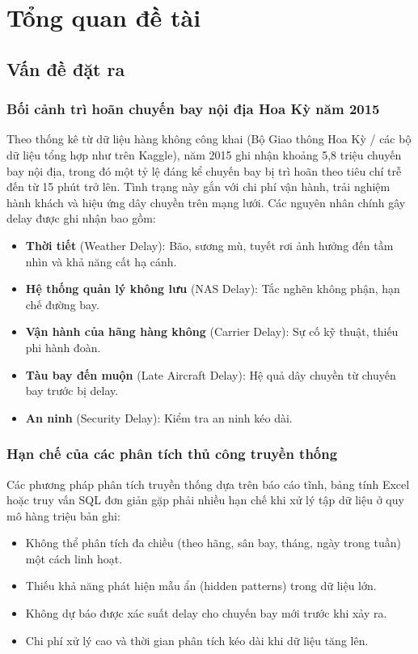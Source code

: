 \section{Tổng quan đề tài}

\subsection{Vấn đề đặt ra}

\subsubsection{Bối cảnh trì hoãn chuyến bay nội địa Hoa Kỳ năm 2015}

\indent Theo thống kê từ dữ liệu hàng không công khai (Bộ Giao thông Hoa Kỳ / các bộ dữ liệu tổng hợp như trên Kaggle),
năm 2015 ghi nhận khoảng 5{,}8 triệu chuyến bay nội địa, trong đó một tỷ lệ đáng kể chuyến bay bị trì hoãn
theo tiêu chí trễ đến từ 15 phút trở lên. Tình trạng này gắn với chi phí vận hành, trải nghiệm hành khách
và hiệu ứng dây chuyền trên mạng lưới.
Các nguyên nhân chính gây delay được ghi nhận bao gồm:
\begin{itemize}
    \item \textbf{Thời tiết} (Weather Delay): Bão, sương mù, tuyết rơi ảnh hưởng đến tầm nhìn và khả năng cất hạ cánh.
    \item \textbf{Hệ thống quản lý không lưu} (NAS Delay): Tắc nghẽn không phận, hạn chế đường bay.
    \item \textbf{Vận hành của hãng hàng không} (Carrier Delay): Sự cố kỹ thuật, thiếu phi hành đoàn.
    \item \textbf{Tàu bay đến muộn} (Late Aircraft Delay): Hệ quả dây chuyền từ chuyến bay trước bị delay.
    \item \textbf{An ninh} (Security Delay): Kiểm tra an ninh kéo dài.
\end{itemize}

\subsubsection{Hạn chế của các phân tích thủ công truyền thống}

Các phương pháp phân tích truyền thống dựa trên báo cáo tĩnh, bảng tính Excel hoặc truy vấn SQL đơn giản
gặp phải nhiều hạn chế khi xử lý tập dữ liệu ở quy mô hàng triệu bản ghi:
\begin{itemize}
    \item Không thể phân tích đa chiều (theo hãng, sân bay, tháng, ngày trong tuần) một cách linh hoạt.
    \item Thiếu khả năng phát hiện mẫu ẩn (hidden patterns) trong dữ liệu lớn.
    \item Không dự báo được xác suất delay cho chuyến bay mới trước khi xảy ra.
    \item Chi phí xử lý cao và thời gian phân tích kéo dài khi dữ liệu tăng lên.
\end{itemize}

